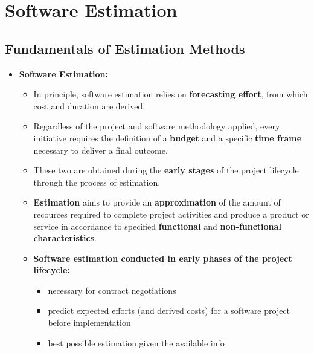 \documentclass[ieeetran]{article}
\begin{document}
\section{Software Estimation} %
\label{sec:software_estimation}

\subsection{Fundamentals of Estimation Methods} %
\label{sub:fundamentals_of_estimation_methods}
\begin{itemize}
  \item \textbf{Software Estimation:}
\begin{itemize}
  \item In principle, software estimation relies on \textbf{forecasting effort}, from which cost and duration are derived.
\item Regardless of the project and software methodology applied, every initiative requires the definition of a \textbf{budget} and a specific \textbf{time frame} necessary to deliver a final outcome.

\item These two are obtained during the \textbf{early stages} of the project lifecycle through the process of estimation.
\item \textbf{Estimation} aims to provide an \textbf{approximation} of the amount of recources required to complete project activities and produce a product or service in accordance to specified \textbf{functional} and \textbf{non-functional characteristics}.

\item \textbf{Software estimation conducted in early phases of the project lifecycle:}
	\begin{itemize}
	  \item necessary for contract negotiations
	\item predict expected efforts (and derived costs) for a software project before implementation
         \item best possible estimation given the available info
	\end{itemize}


\end{itemize}
\end{itemize}
\end{document}
